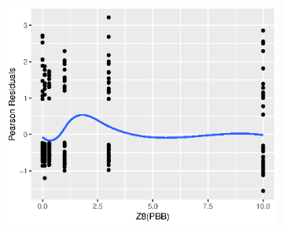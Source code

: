 \documentclass{article}
\begin{document}
\begin{enumerate}[leftmargin = 0 em, label = \arabic*., font = \bfseries]
\begin{enumerate}
\begin{figure}[!htb]
\begin{subfigure}[b]{0.3\textwidth}
			\end{subfigure}%
			\begin{subfigure}[b]{0.3\textwidth}
			\includegraphics[width = \textwidth]{pz8.eps}
			\end{subfigure}%


\end{figure}
\end{enumerate}
\end{enumerate}
\end{document}
